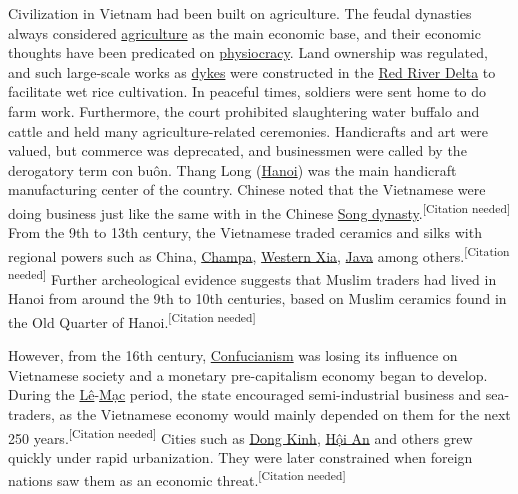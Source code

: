\documentclass[openany]{book}
\begin{document}
Civilization in Vietnam had been built on agriculture. The feudal dynasties always considered \href{https://en.wikipedia.org/wiki/Agriculture}{agriculture} as the main economic base, and their economic thoughts have been predicated on \href{https://en.wikipedia.org/wiki/Physiocracy}{physiocracy}. Land ownership was regulated, and such large-scale works as \href{https://en.wikipedia.org/wiki/Dike_(construction)}{dykes} were constructed in the \href{https://en.wikipedia.org/wiki/Red_River_Delta}{Red River Delta} to facilitate wet rice cultivation. In peaceful times, soldiers were sent home to do farm work. Furthermore, the court prohibited slaughtering water buffalo and cattle and held many agriculture-related ceremonies. Handicrafts and art were valued, but commerce was deprecated, and businessmen were called by the derogatory term con buôn. Thang Long (\href{https://en.wikipedia.org/wiki/Hanoi}{Hanoi}) was the main handicraft manufacturing center of the country. Chinese noted that the Vietnamese were doing business just like the same with in the Chinese \href{https://en.wikipedia.org/wiki/Song_dynasty}{Song dynasty}.\textsuperscript{[Citation needed]} From the 9th to 13th century, the Vietnamese traded ceramics and silks with regional powers such as China, \href{https://en.wikipedia.org/wiki/Champa}{Champa}, \href{https://en.wikipedia.org/wiki/Western_Xia}{Western Xia}, \href{https://en.wikipedia.org/wiki/Java}{Java} among others.\textsuperscript{[Citation needed]} Further archeological evidence suggests that Muslim traders had lived in Hanoi from around the 9th to 10th centuries, based on Muslim ceramics found in the Old Quarter of Hanoi.\textsuperscript{[Citation needed]}

However, from the 16th century, \href{https://en.wikipedia.org/wiki/Confucianism}{Confucianism} was losing its influence on Vietnamese society and a monetary pre-capitalism economy began to develop. During the \href{https://en.wikipedia.org/wiki/L%C3%AA_dynasty}{Lê}-\href{https://en.wikipedia.org/wiki/M%E1%BA%A1c_dynasty}{Mạc} period, the state encouraged semi-industrial business and sea-traders, as the Vietnamese economy would mainly depended on them for the next 250 years.\textsuperscript{[Citation needed]} Cities such as \href{https://en.wikipedia.org/wiki/Dong_Kinh}{Dong Kinh}, \href{https://en.wikipedia.org/wiki/H%E1%BB%99i_An}{Hội An} and others grew quickly under rapid urbanization. They were later constrained when foreign nations saw them as an economic threat.\textsuperscript{[Citation needed]}
\end{document}
